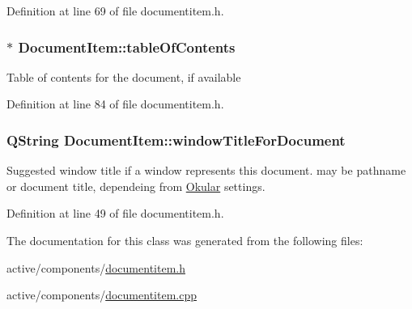 Definition at line 69 of file documentitem.\+h.

\hypertarget{classDocumentItem_a9291b1c2f73d783093898bdeb6562842}{
\subsubsection[{table\+Of\+Contents}]{ $\ast$ Document\+Item\+::table\+Of\+Contents\hspace{0.3cm}{\ttfamily [read]}}}\label{classDocumentItem_a9291b1c2f73d783093898bdeb6562842}
Table of contents for the document, if available 

Definition at line 84 of file documentitem.\+h.

\hypertarget{classDocumentItem_ad992855c3e20bfc6b4b62adc2f96061c}{
\subsubsection[{window\+Title\+For\+Document}]{\setlength{\rightskip}{0pt plus 5cm}Q\+String Document\+Item\+::window\+Title\+For\+Document\hspace{0.3cm}{\ttfamily [read]}}}\label{classDocumentItem_ad992855c3e20bfc6b4b62adc2f96061c}
Suggested window title if a window represents this document. may be pathname or document title, dependeing from \hyperlink{namespaceOkular}{Okular} settings. 

Definition at line 49 of file documentitem.\+h.



The documentation for this class was generated from the following files\+:\begin{DoxyCompactItemize}
\item 
active/components/\hyperlink{documentitem_8h}{documentitem.\+h}\item 
active/components/\hyperlink{documentitem_8cpp}{documentitem.\+cpp}\end{DoxyCompactItemize}
